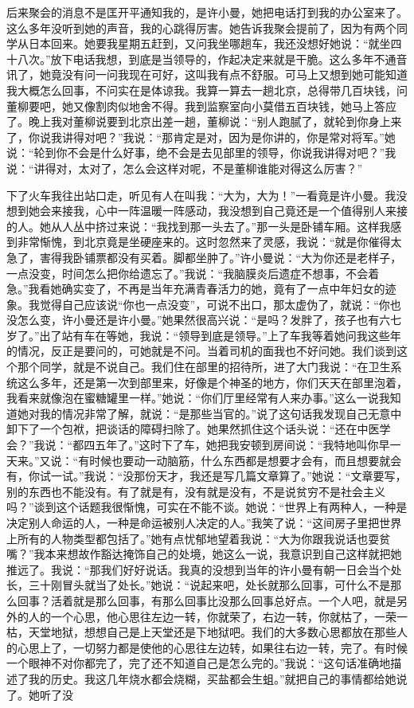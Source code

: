 \documentclass[12pt,oneside]{book}
\begin{document}
后来聚会的消息不是匡开平通知我的，是许小曼，她把电话打到我的办公室来了。这么多年没听到她的声音，我的心跳得厉害。她告诉我聚会提前了，因为有两个同学从日本回来。她要我星期五赶到，又问我坐哪趟车，我还没想好她说：``就坐四十八次。''放下电话我想，到底是当领导的，作起决定来就是干脆。这么多年不通音讯了，她竟没有问一问我现在可好，这叫我有点不舒服。可马上又想到她可能知道我大概怎么回事，不问实在是体谅我。我算一算去一趟北京，总得带几百块钱，问董柳要吧，她又像割肉似地舍不得。我到监察室向小莫借五百块钱，她马上答应了。晚上我对董柳说要到北京出差一趟，董柳说：``别人跑腻了，就轮到你身上来了，你说我讲得对吧？''我说：``那肯定是对，因为是你讲的，你是常对将军。''她说：``轮到你不会是什么好事，绝不会是去见部里的领导，你说我讲得对吧？''我说：``讲得对，太对了，怎么会这样对呢，不是董柳谁能对得这么厉害？''

下了火车我往出站口走，听见有人在叫我：``大为，大为！''一看竟是许小曼。我没想到她会来接我，心中一阵温暖一阵感动，我没想到自己竟还是一个值得别人来接的人。她从人丛中挤过来说：``我找到那一头去了。''那一头是卧铺车厢。这样我感到非常惭愧，到北京竟是坐硬座来的。这时忽然来了灵感，我说：``就是你催得太急了，害得我卧铺票都没有买着。脚都坐肿了。''许小曼说：``大为你还是老样子，一点没变，时间怎么把你给遗忘了。''我说：``我脑膜炎后遗症不想事，不会着急。''我看她确实变了，不再是当年充满青春活力的她，竟有了一点中年妇女的迹象。我觉得自己应该说``你也一点没变''，可说不出口，那太虚伪了，就说：``你也没怎么变，许小曼还是许小曼。''她果然很高兴说：``是吗？发胖了，孩子也有六七岁了。''出了站有车在等她，我说：``领导到底是领导。''上了车我等着她问我这些年的情况，反正是要问的，可她就是不问。当着司机的面我也不好问她。我们谈到这个那个同学，就是不说自己。我们住在部里的招待所，进了大门我说：``在卫生系统这么多年，还是第一次到部里来，好像是个神圣的地方，你们天天在部里泡着，我看来就像泡在蜜糖罐里一样。''她说：``你们厅里经常有人来办事。''这么一说我知道她对我的情况非常了解，就说：``是那些当官的。''说了这句话我发现自己无意中卸下了一个包袱，把谈话的障碍扫除了。她果然抓住这个话头说：``还在中医学会？''我说：``都四五年了。''这时下了车，她把我安顿到房间说：``我特地叫你早一天来。''又说：``有时候也要动一动脑筋，什么东西都是想要才会有，而且想要就会有，你试一试。''我说：``没那份天才，我还是写几篇文章算了。''她说：``文章要写，别的东西也不能没有。有了就是有，没有就是没有，不是说贫穷不是社会主义吗？''谈到这个话题我很惭愧，可实在不能不谈。她说：``世界上有两种人，一种是决定别人命运的人，一种是命运被别人决定的人。''我笑了说：``这间房子里把世界上所有的人物类型都包括了。''她有点忧郁地望着我说：``大为你跟我说话也耍贫嘴？''我本来想故作豁达掩饰自己的处境，她这么一说，我意识到自己这样就把她推远了。我说：``那我们好好说话。我真的没想到当年的许小曼有朝一日会当个处长，三十刚冒头就当了处长。''她说：``说起来吧，处长就那么回事，可什么不是那么回事？活着就是那么回事，有那么回事比没那么回事总好点。一个人吧，就是另外的人的一个心思，他心思往左边一转，你就荣了，右边一转，你就枯了，一荣一枯，天堂地狱，想想自己是上天堂还是下地狱吧。我们的大多数心思都放在那些人的心思上了，一切努力都是使他的心思往左边转，如果往右边一转，完了。有时候一个眼神不对你都完了，完了还不知道自己是怎么完的。''我说：``这句话准确地描述了我的历史。我这几年烧水都会烧糊，买盐都会生蛆。''就把自己的事情都给她说了。她听了没
\end{document}

